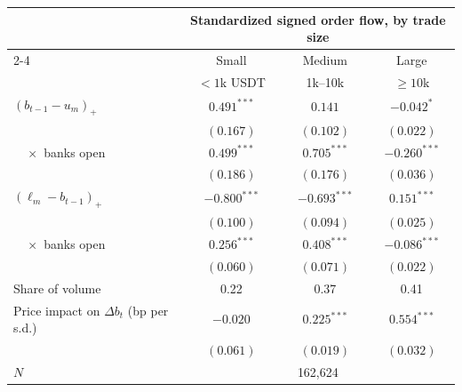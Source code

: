 \begin{tabular}{lccc}
\toprule
 & \multicolumn{3}{c}{Standardized signed order flow, by trade size} \\
\cmidrule(lr){2-4}
 & Small & Medium & Large \\
 & $<1$k USDT & 1k--10k & $\ge 10$k \\
\midrule
$(b_{t-1}-u_m)_+$ & $0.491^{***}$ & $0.141$ & $-0.042^{*}$ \\
 & $(0.167)$ & $(0.102)$ & $(0.022)$ \\
$\quad\times$ banks open & $0.499^{***}$ & $0.705^{***}$ & $-0.260^{***}$ \\
 & $(0.186)$ & $(0.176)$ & $(0.036)$ \\
$(\ell_m-b_{t-1})_+$ & $-0.800^{***}$ & $-0.693^{***}$ & $0.151^{***}$ \\
 & $(0.100)$ & $(0.094)$ & $(0.025)$ \\
$\quad\times$ banks open & $0.256^{***}$ & $0.408^{***}$ & $-0.086^{***}$ \\
 & $(0.060)$ & $(0.071)$ & $(0.022)$ \\
\midrule
Share of volume & 0.22 & 0.37 & 0.41 \\
Price impact on $\Delta b_t$ (bp per s.d.) & $-0.020$ & $0.225^{***}$ & $0.554^{***}$ \\
 & $(0.061)$ & $(0.019)$ & $(0.032)$ \\
$N$ & \multicolumn{3}{c}{162,624} \\
\bottomrule
\end{tabular}
